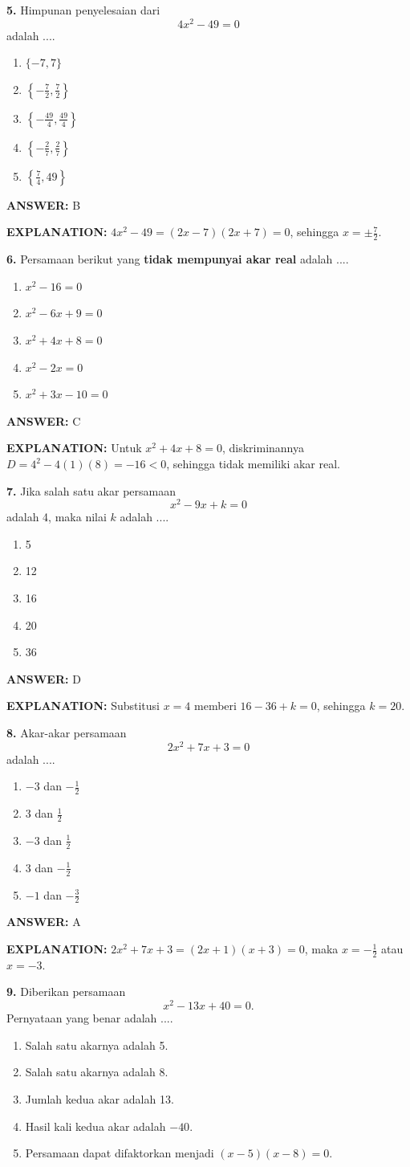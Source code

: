\documentclass[11pt,a4paper]{article}
\newcommand{\answer}[1]{\par\medskip\textbf{\color{jawab}ANSWER:} #1\par}
\newcommand{\explanation}[1]{\textbf{\color{jelas}EXPLANATION:} #1\par\medskip}
\newcommand{\question}[1]{\Needspace{7\baselineskip}\par\medskip\textbf{#1}\quad}
\newenvironment{choices}{\begin{enumerate}[label=\Alph*.,leftmargin=1.8em]}{\end{enumerate}}
\begin{document}
\question{5.} Himpunan penyelesaian dari \[4x^2-49=0\] adalah ....
\begin{choices}\item $\{-7,7\}$\item $\left\{-\frac72,\frac72\right\}$\item $\left\{-\frac{49}{4},\frac{49}{4}\right\}$\item $\left\{-\frac27,\frac27\right\}$\item $\left\{\frac74,49\right\}$\end{choices}
\answer{B}\explanation{$4x^2-49=(2x-7)(2x+7)=0$, sehingga $x=\pm\frac72$.}
\question{6.} Persamaan berikut yang \textbf{tidak mempunyai akar real} adalah ....
\begin{choices}\item $x^2-16=0$\item $x^2-6x+9=0$\item $x^2+4x+8=0$\item $x^2-2x=0$\item $x^2+3x-10=0$\end{choices}
\answer{C}\explanation{Untuk $x^2+4x+8=0$, diskriminannya $D=4^2-4(1)(8)=-16<0$, sehingga tidak memiliki akar real.}
\question{7.} Jika salah satu akar persamaan \[x^2-9x+k=0\] adalah 4, maka nilai $k$ adalah ....
\begin{choices}\item 5\item 12\item 16\item 20\item 36\end{choices}
\answer{D}\explanation{Substitusi $x=4$ memberi $16-36+k=0$, sehingga $k=20$.}
\question{8.} Akar-akar persamaan \[2x^2+7x+3=0\] adalah ....
\begin{choices}\item $-3$ dan $-\frac12$\item 3 dan $\frac12$\item $-3$ dan $\frac12$\item 3 dan $-\frac12$\item $-1$ dan $-\frac32$\end{choices}
\answer{A}\explanation{$2x^2+7x+3=(2x+1)(x+3)=0$, maka $x=-\frac12$ atau $x=-3$.}
\question{9.} Diberikan persamaan \[x^2-13x+40=0.\] Pernyataan yang benar adalah ....
\begin{choices}\item Salah satu akarnya adalah 5.\item Salah satu akarnya adalah 8.\item Jumlah kedua akar adalah 13.\item Hasil kali kedua akar adalah $-40$.\item Persamaan dapat difaktorkan menjadi $(x-5)(x-8)=0$.\end{choices}
\end{document}
